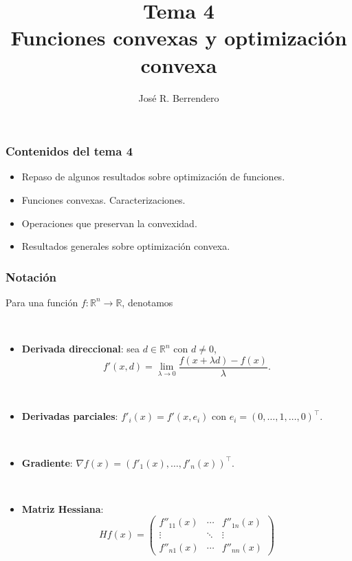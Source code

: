 \documentclass{beamer}
\title[Estad\'{\i}stica: Tema 4]{Tema 4\\
Funciones convexas y optimización convexa}
\author[Berrendero]
{Jos\'{e} R. Berrendero}
\date{}
\institute{Departamento de Matem\'{a}ticas\\
 Universidad Aut\'{o}noma de Madrid}
\begin{document}



\frame{\titlepage}
\begin{frame}[plain]
\frametitle{Contenidos del tema 4}

\begin{itemize}
 
\item Repaso de algunos resultados sobre optimización de funciones.
\item Funciones convexas. Caracterizaciones.
\item Operaciones que preservan la convexidad.	
\item Resultados generales sobre optimización convexa.

 
\end{itemize}


\end{frame}
\begin{frame}
\frametitle{Notación}

{\scriptsize
Para una función $f:\mathbb{R}^n\to \mathbb{R}$, denotamos

\

\begin{itemize}
\item \textbf{Derivada direccional}: sea $d\in\mathbb{R}^n$ con $d\neq 0$,
\[
f'(x,d)=\lim_{\lambda\to 0} \frac{f(x+\lambda d)-f(x)}{\lambda}.
\]

\

\item \textbf{Derivadas parciales}: $f'_i(x) = f'(x,e_i)$ con $e_i=(0,\ldots,1,\ldots,0)^\top$.

\

\item \textbf{Gradiente}: $\nabla f(x) = (f'_1(x),\ldots,f'_n(x))^\top$.

\

\item \textbf{Matriz Hessiana}:
\[
Hf(x) = \left(\begin{array}{ccc}
f''_{11}(x) & \cdots & f''_{1n}(x) \\
\vdots & \ddots & \vdots \\
f''_{n1}(x) & \cdots & f''_{nn}(x)
\end{array}  \right)
\]

\end{itemize}
}


\end{frame}
\end{document}
